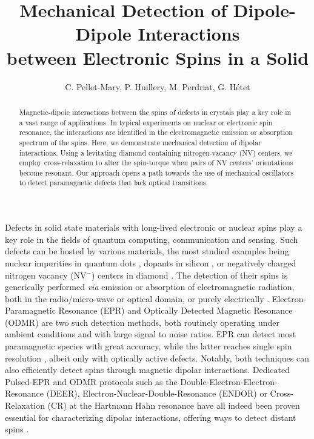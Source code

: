 \documentclass[preprintnumbers,amsmath,amssymb,superscriptaddress,twocolumn,showpacs]{revtex4-1}
\begin{document}
\title{Mechanical Detection of Dipole-Dipole Interactions \\between Electronic Spins in a Solid}

\author{C. Pellet-Mary, P. Huillery, M. Perdriat, G. H\'etet} 


\begin{abstract}
Magnetic-dipole interactions between the spins of defects in crystals play a key role in a vast range of applications. In typical experiments on nuclear or electronic spin resonance, the interactions are identified in the electromagnetic emission or absorption spectrum of the spins.
Here, we demonstrate mechanical detection of dipolar interactions. 
Using a levitating diamond containing nitrogen-vacancy (NV) centers, we employ cross-relaxation to alter 
the spin-torque when pairs of NV centers' orientations become resonant.
Our approach opens a path towards the use of mechanical oscillators to detect paramagnetic defects that lack optical transitions. 
\end{abstract}

\maketitle

Defects in solid state materials with long-lived electronic or nuclear spins play a key role in the fields of quantum computing, communication and sensing. 
Such defects can be hosted by various materials, the most studied examples being nuclear impurities in quantum dots \cite{Qdots}, dopants in silicon \cite{Zwanenburg}, or negatively charged nitrogen vacancy (NV$^-$) centers in diamond \cite{Doherty}.
The detection of their spins is generically performed {\it via} emission or absorption of electromagnetic radiation, both in the radio/micro-wave or optical domain, or purely electrically \cite{Zwanenburg, Hopper}.
Electron-Paramagnetic Resonance (EPR) and Optically Detected Magnetic Resonance (ODMR) are two such detection methods, both routinely operating under ambient conditions and with large signal to noise ratios.
EPR can detect most paramagnetic species with great accuracy, while the latter reaches single spin resolution \cite{Wrachtrup1}, albeit only with optically active defects.
Notably, both techniques can also efficiently detect spins through magnetic dipolar interactions. 
Dedicated Pulsed-EPR \cite{Mims} and ODMR protocols such as the Double-Electron-Electron-Resonance (DEER), Electron-Nuclear-Double-Resonance (ENDOR) or Cross-Relaxation (CR) at the Hartmann Hahn resonance have all indeed been proven essential for characterizing dipolar interactions, offering ways to detect distant spins \cite{Mamin}.
\end{document}
